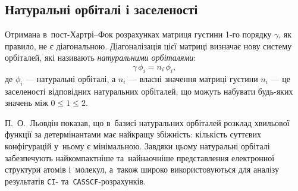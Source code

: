 
\subsection{Натуральні орбіталі і заселеності}

Отримана в~пост-Хартрі–Фок розрахунках матриця густини 1-го порядку $\gamma$, як правило, не є діагональною.
Діагоналізація цієї матриці визначає нову систему орбіталей, які називають \emph{натуральними орбіталями}:
\[
	\gamma\, \phi_i = n_i\, \phi_i,
\]
де $\phi_i$ --- натуральні орбіталі, а $n_i$ --- власні значення матриці густини $n_i$ --- це заселеності відповідних натуральних орбіталей,
що можуть набувати будь-яких значень між $0 \leqslant 1 \leqslant 2$.

П.~О.~Льовдін показав, що в~базисі натуральних орбіталей
розклад хвильової функції за детермінантами має найкращу збіжність:
кількість суттєвих  конфігурацій у~ньому є мінімальною.
Завдяки цьому натуральні орбіталі забезпечують
найкомпактніше та~найнаочніше представлення електронної структури атомів і~молекул,
а~також широко використовуються для аналізу результатів \texttt{CI}- та~\texttt{CASSCF}-розрахунків.

